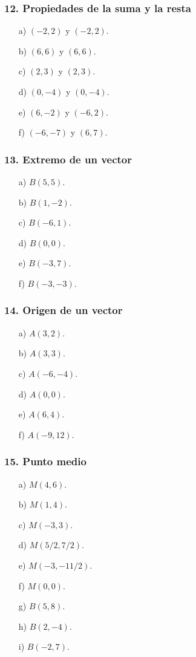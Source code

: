 \subsubsection*{12. Propiedades de la suma y la resta}
\begin{enumerate}
    \item[a)] $(-2,2)$ y $(-2,2)$.
    \item[b)] $(6,6)$ y $(6,6)$.
    \item[c)] $(2,3)$ y $(2,3)$.
    \item[d)] $(0,-4)$ y $(0,-4)$.
    \item[e)] $(6,-2)$ y $(-6,2)$.
    \item[f)] $(-6,-7)$ y $(6,7)$.
\end{enumerate}

\subsubsection*{13. Extremo de un vector}
\begin{enumerate}
    \item[a)] $B(5,5)$.
    \item[b)] $B(1,-2)$.
    \item[c)] $B(-6,1)$.
    \item[d)] $B(0,0)$.
    \item[e)] $B(-3,7)$.
    \item[f)] $B(-3,-3)$.
\end{enumerate}

\subsubsection*{14. Origen de un vector}
\begin{enumerate}
    \item[a)] $A(3,2)$.
    \item[b)] $A(3,3)$.
    \item[c)] $A(-6,-4)$.
    \item[d)] $A(0,0)$.
    \item[e)] $A(6,4)$.
    \item[f)] $A(-9,12)$.
\end{enumerate}

\subsubsection*{15. Punto medio}
\begin{enumerate}
    \item[a)] $M(4,6)$.
    \item[b)] $M(1,4)$.
    \item[c)] $M(-3,3)$.
    \item[d)] $M(5/2,7/2)$.
    \item[e)] $M(-3,-11/2)$.
    \item[f)] $M(0,0)$.
    \item[g)] $B(5,8)$.
    \item[h)] $B(2,-4)$.
    \item[i)] $B(-2,7)$.
\end{enumerate}

